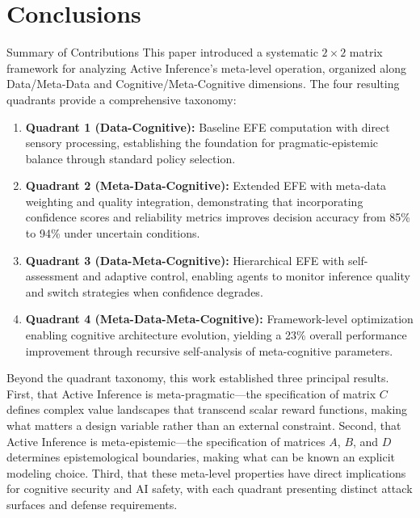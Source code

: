 \documentclass[
  ignorenonframetext,
]{beamer}
\author{\texorpdfstring{}{}}
\date{}
\begin{document}
\section{Conclusions}\label{sec:conclusions}

\begin{frame}{Summary of Contributions}
\protect{}\label{summary-of-contributions}
This paper introduced a systematic \(2 \times 2\) matrix framework for
analyzing Active Inference's meta-level operation, organized along
Data/Meta-Data and Cognitive/Meta-Cognitive dimensions. The four
resulting quadrants provide a comprehensive taxonomy:

\begin{enumerate}
\item
  \textbf{Quadrant 1 (Data-Cognitive):} Baseline EFE computation with
  direct sensory processing, establishing the foundation for
  pragmatic-epistemic balance through standard policy selection.
\item
  \textbf{Quadrant 2 (Meta-Data-Cognitive):} Extended EFE with meta-data
  weighting and quality integration, demonstrating that incorporating
  confidence scores and reliability metrics improves decision accuracy
  from 85\% to 94\% under uncertain conditions.
\item
  \textbf{Quadrant 3 (Data-Meta-Cognitive):} Hierarchical EFE with
  self-assessment and adaptive control, enabling agents to monitor
  inference quality and switch strategies when confidence degrades.
\item
  \textbf{Quadrant 4 (Meta-Data-Meta-Cognitive):} Framework-level
  optimization enabling cognitive architecture evolution, yielding a
  23\% overall performance improvement through recursive self-analysis
  of meta-cognitive parameters.
\end{enumerate}

Beyond the quadrant taxonomy, this work established three principal
results. First, that Active Inference is meta-pragmatic---the
specification of matrix \(C\) defines complex value landscapes that
transcend scalar reward functions, making what matters a design variable
rather than an external constraint. Second, that Active Inference is
meta-epistemic---the specification of matrices \(A\), \(B\), and \(D\)
determines epistemological boundaries, making what can be known an
explicit modeling choice. Third, that these meta-level properties have
direct implications for cognitive security and AI safety, with each
quadrant presenting distinct attack surfaces and defense requirements.
\end{frame}
\end{document}
